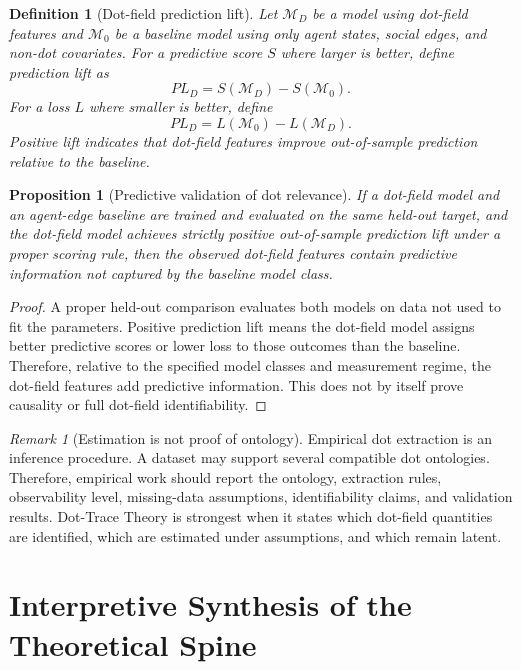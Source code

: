 \documentclass[11pt]{article}
\newtheorem{definition}{Definition}
\newtheorem{proposition}{Proposition}
\theoremstyle{remark}
\newtheorem{remark}{Remark}
\begin{document}
\begin{definition}[Dot-field prediction lift]\label{def:dot-field-prediction-lift}
Let $\mathcal M_D$ be a model using dot-field features and $\mathcal M_0$
be a baseline model using only agent states, social edges, and non-dot
covariates. For a predictive score $S$ where larger is better, define
prediction lift as
$$
PL_D=S(\mathcal M_D)-S(\mathcal M_0).
$$
For a loss $L$ where smaller is better, define
$$
PL_D=L(\mathcal M_0)-L(\mathcal M_D).
$$
Positive lift indicates that dot-field features improve out-of-sample
prediction relative to the baseline.
\end{definition}

\begin{proposition}[Predictive validation of dot relevance]\label{prop:predictive-validation-dot-relevance}
If a dot-field model and an agent-edge baseline are trained and evaluated
on the same held-out target, and the dot-field model achieves strictly
positive out-of-sample prediction lift under a proper scoring rule, then
the observed dot-field features contain predictive information not
captured by the baseline model class.
\end{proposition}

\begin{proof}
A proper held-out comparison evaluates both models on data not used to
fit the parameters. Positive prediction lift means the dot-field model
assigns better predictive scores or lower loss to those outcomes than
the baseline. Therefore, relative to the specified model classes and
measurement regime, the dot-field features add predictive information.
This does not by itself prove causality or full dot-field
identifiability.
\end{proof}

\begin{remark}[Estimation is not proof of ontology]
Empirical dot extraction is an inference procedure. A dataset may support
several compatible dot ontologies. Therefore, empirical work should
report the ontology, extraction rules, observability level, missing-data
assumptions, identifiability claims, and validation results. Dot-Trace
Theory is strongest when it states which dot-field quantities are
identified, which are estimated under assumptions, and which remain
latent.
\end{remark}


\section{Interpretive Synthesis of the Theoretical Spine}\label{interpretive-synthesis-theoretical-spine}
\end{document}
